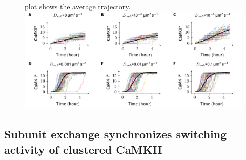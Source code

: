 \documentclass[9pt,lineno,doublespacing]{elife}
\begin{document}
\begin{figure}
{    plot shows the average trajectory.
}{\includegraphics[width=\linewidth]{./PaperFigures/suppl/figure_camkii_activations_trajs.pdf}}
\label{figsupp:camkii_activation_se_trajs} 
\end{figure}



\subsection{Subunit exchange synchronizes switching activity of clustered CaMKII}
\label{subsec:se_sync_switches}
\end{document}
